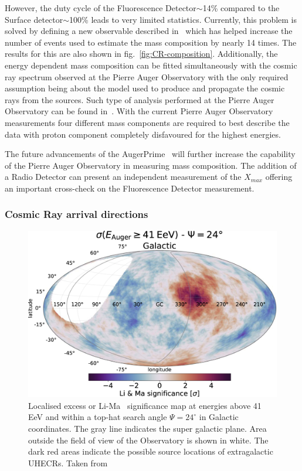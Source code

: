 However, the duty cycle of the Fluorescence Detector$\sim$14\% compared to the Surface detector$\sim$100\% leads to very limited statistics. Currently, this problem is solved by defining a new observable described in~\cite{2017arXiv171007249T} which has helped increase the number of events used to estimate the mass composition by nearly 14 times. The results for this are also shown in fig.~\ref{fig:CR-composition}. Additionally, the energy dependent mass composition can be fitted simultaneously with the cosmic ray spectrum observed at the Pierre Auger Observatory with the only required assumption being about the model used to produce and propagate the cosmic rays from the sources. Such type of analysis performed at the Pierre Auger Observatory can be found in~\cite{2018_auger_comp_spec}. With the current Pierre Auger Observatory measurements four different mass components are required to best describe the data with proton component completely disfavoured for the highest energies.

The future advancements of the AugerPrime~\cite{ANASTASI2022167497} will further increase the capability of the Pierre Auger Observatory in measuring mass composition. The addition of a Radio Detector can present an independent measurement of the $X_{max}$ offering an important cross-check on the Fluorescence Detector measurement. 

\subsubsection*{Cosmic Ray arrival directions}
\label{subsubsec:CRdirec}
\begin{figure}[t!]
  \centering
  \includegraphics[width=14.5cm]{thesis_figures/CRnNu/apjac7d4ef1_hr.jpg}
  \caption{Localised excess or Li-Ma~\cite{Li:1983fv} significance map at energies above 41 EeV and within a top-hat search angle $\Psi = 24^\circ$ in Galactic coordinates. The gray line indicates the super galactic plane. Area outside the field of view of the Observatory is shown in white. The dark red areas indicate the possible source locations of extragalactic UHECRs. Taken from~\cite{Abreu_2022}}
  \label{fig:CR-anisotropy}
\end{figure}

